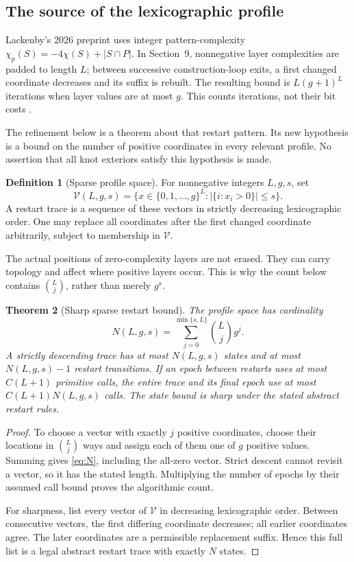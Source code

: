 \documentclass[11pt,letterpaper]{article}
\newtheorem{theorem}{Theorem}[section]
\theoremstyle{definition}
\newtheorem{definition}[theorem]{Definition}
\theoremstyle{remark}
\begin{document}
\subsection{The source of the lexicographic profile}
Lackenby's 2026 preprint uses integer pattern-complexity
$\chi_p(S)=-4\chi(S)+|S\cap P|$. In Section~9, nonnegative layer
complexities are padded to length $L$; between successive construction-loop
exits, a first changed coordinate decreases and its suffix is rebuilt.
The resulting bound is $L(g+1)^L$ iterations when layer values are at most
$g$. This counts iterations, not their bit costs \cite[Section~9]{lackenby}.

The refinement below is a theorem about that restart pattern. Its new
hypothesis is a bound on the number of positive coordinates in every
relevant profile. No assertion that all knot exteriors satisfy this
hypothesis is made.

\begin{definition}[Sparse profile space]
For nonnegative integers $L,g,s$, set
\[
 \mathcal V(L,g,s)=\{x\in\{0,1,\ldots,g\}^L:
       |\{i:x_i>0\}|\leq s\}.
\]
A restart trace is a sequence of these vectors in strictly decreasing
lexicographic order. One may replace all coordinates after the first
changed coordinate arbitrarily, subject to membership in $\mathcal V$.
\end{definition}

The actual positions of zero-complexity layers are not erased. They can
carry topology and affect where positive layers occur. This is why the
count below contains $\binom Lj$, rather than merely $g^s$.

\begin{theorem}[Sharp sparse restart bound]
\label{thm:entropy}
The profile space has cardinality
\begin{equation}
 N(L,g,s)=\sum_{j=0}^{\min\{s,L\}}\binom Lj g^j.
 \label{eq:N}
\end{equation}
A strictly descending trace has at most $N(L,g,s)$ states and at most
$N(L,g,s)-1$ restart transitions. If an epoch between restarts uses at most
$C(L+1)$ primitive calls, the entire trace and its final epoch use at most
$C(L+1)N(L,g,s)$ calls. The state bound is sharp under the stated abstract
restart rules.
\end{theorem}
\begin{proof}
To choose a vector with exactly $j$ positive coordinates, choose their
locations in $\binom Lj$ ways and assign each of them one of $g$ positive
values. Summing gives \eqref{eq:N}, including the all-zero vector.
Strict descent cannot revisit a vector, so it has the stated length.
Multiplying the number of epochs by their assumed call bound proves the
algorithmic count.

For sharpness, list every vector of $\mathcal V$ in decreasing
lexicographic order. Between consecutive vectors, the first differing
coordinate decreases; all earlier coordinates agree. The later coordinates
are a permissible replacement suffix. Hence this full list is a legal
abstract restart trace with exactly $N$ states.
\end{proof}
\end{document}
